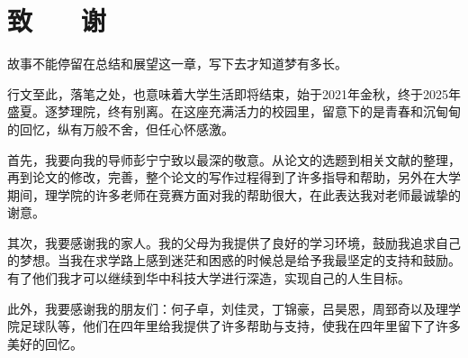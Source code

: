 \section*{致 ~~ 谢}
故事不能停留在总结和展望这一章，写下去才知道梦有多长。

行文至此，落笔之处，也意味着大学生活即将结束，始于2021年金秋，终于2025年盛夏。逐梦理院，终有别离。在这座充满活力的校园里，留意下的是青春和沉甸甸的回忆，纵有万般不舍，但任心怀感激。

首先，我要向我的导师彭宁宁致以最深的敬意。从论文的选题到相关文献的整理，再到论文的修改，完善，整个论文的写作过程得到了许多指导和帮助，另外在大学期间，理学院的许多老师在竞赛方面对我的帮助很大，在此表达我对老师最诚挚的谢意。

其次，我要感谢我的家人。我的父母为我提供了良好的学习环境，鼓励我追求自己的梦想。当我在求学路上感到迷茫和困惑的时候总是给予我最坚定的支持和鼓励。有了他们我才可以继续到华中科技大学进行深造，实现自己的人生目标。

此外，我要感谢我的朋友们：何子卓，刘佳灵，丁锦豪，吕昊恩，周郅奇以及理学院足球队等，他们在四年里给我提供了许多帮助与支持，使我在四年里留下了许多美好的回忆。


